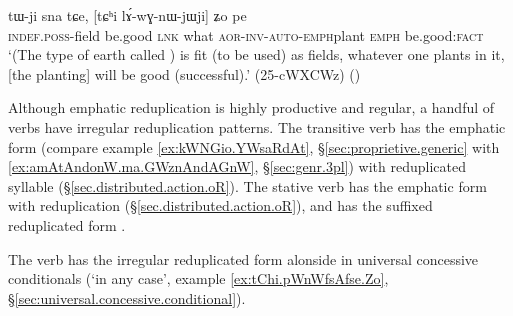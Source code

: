  \begin{exe}
\ex \label{ex:tChi.lAwGnWjWji.Zo}
\gll tɯ-ji sna tɕe, [tɕʰi lɤ́-wɣ-nɯ-jɯ\redp{}ji] ʑo pe \\
\textsc{indef}.\textsc{poss}-field be.good \textsc{lnk} what \textsc{aor}-\textsc{inv}-\textsc{auto}-\textsc{emph}\redp{}plant \textsc{emph} be.good:\textsc{fact} \\
\glt `(The type of earth called ) is fit (to be used) as fields, whatever one plants in it, [the planting] will be good (successful).' (25-cWXCWz) ()
\end{exe}


Although emphatic reduplication is highly productive and regular, a handful of verbs have irregular reduplication patterns. The transitive verb   has the emphatic form  (compare example \ref{ex:kWNGio.YWsaRdAt}, §\ref{sec:proprietive.generic} with \ref{ex:amAtAndonW.ma.GWznAndAGnW}, §\ref{sec:genr.3pl}) with  reduplicated syllable (§\ref{sec.distributed.action.oR}).  The stative verb  has the emphatic form  with  reduplication (§\ref{sec.distributed.action.oR}), and  has the suffixed  reduplicated form .

The verb  has the irregular reduplicated form  alonside  in universal concessive conditionals (`in any case', example \ref{ex:tChi.pWnWfsAfse.Zo}, §\ref{sec:universal.concessive.conditional}).
